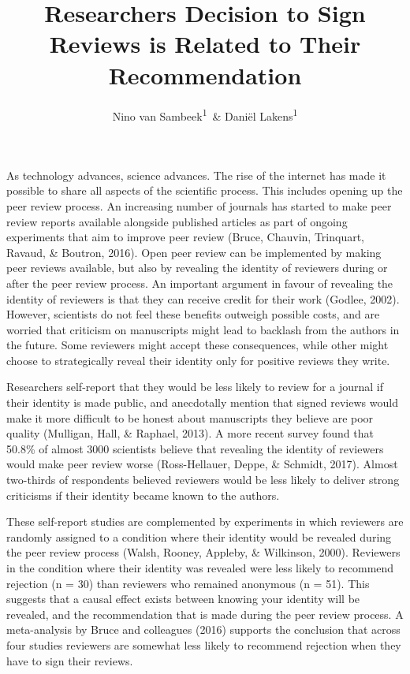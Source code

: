 \documentclass[,jou, a4paper,floatsintext]{apa6}
\title{Researchers Decision to Sign Reviews is Related to Their Recommendation}
\author{Nino van Sambeek\textsuperscript{1}~\& Daniël Lakens\textsuperscript{1}}
\date{}
\affiliation{
\vspace{0.5cm}
\textsuperscript{1} Eindhoven University of Technology, The Netherlands}
\begin{document}
\maketitle

As technology advances, science advances. The rise of the internet has made it possible to share all aspects of the scientific process. This includes opening up the peer review process. An increasing number of journals has started to make peer review reports available alongside published articles as part of ongoing experiments that aim to improve peer review (Bruce, Chauvin, Trinquart, Ravaud, \& Boutron, 2016). Open peer review can be implemented by making peer reviews available, but also by revealing the identity of reviewers during or after the peer review process. An important argument in favour of revealing the identity of reviewers is that they can receive credit for their work (Godlee, 2002). However, scientists do not feel these benefits outweigh possible costs, and are worried that criticism on manuscripts might lead to backlash from the authors in the future. Some reviewers might accept these consequences, while other might choose to strategically reveal their identity only for positive reviews they write.

Researchers self-report that they would be less likely to review for a journal if their identity is made public, and anecdotally mention that signed reviews would make it more difficult to be honest about manuscripts they believe are poor quality (Mulligan, Hall, \& Raphael, 2013). A more recent survey found that 50.8\% of almost 3000 scientists believe that revealing the identity of reviewers would make peer review worse (Ross-Hellauer, Deppe, \& Schmidt, 2017). Almost two-thirds of respondents believed reviewers would be less likely to deliver strong criticisms if their identity became known to the authors.

These self-report studies are complemented by experiments in which reviewers are randomly assigned to a condition where their identity would be revealed during the peer review process (Walsh, Rooney, Appleby, \& Wilkinson, 2000). Reviewers in the condition where their identity was revealed were less likely to recommend rejection (n = 30) than reviewers who remained anonymous (n = 51). This suggests that a causal effect exists between knowing your identity will be revealed, and the recommendation that is made during the peer review process. A meta-analysis by Bruce and colleagues (2016) supports the conclusion that across four studies reviewers are somewhat less likely to recommend rejection when they have to sign their reviews.
\end{document}
